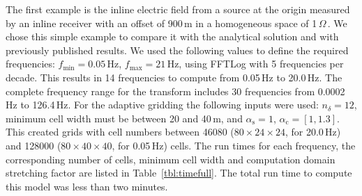 \documentclass[extra, camera,%
    referee,     %
]{gji}
\newcommand{\mr}[1]{\mathrm{#1}}
\newcommand{\ohmm}{\ensuremath{\Omega\,}\text{m}\xspace}
\begin{document}
The first example is the inline electric field from a source at the origin
measured by an inline receiver with an offset of 900\,m in a homogeneous space
of 1\,\ohmm. We chose this simple example to compare it with the analytical
solution and with previously published results. We used the following values to
define the required frequencies: $f_\mr{min}=0.05\,$Hz, $f_\mr{max}=21\,$Hz,
using FFTLog with 5 frequencies per decade. This results in 14 frequencies to
compute from 0.05\,Hz to 20.0\,Hz. The complete frequency range for the
transform includes 30 frequencies from 0.0002\,Hz to 126.4\,Hz. For the
adaptive gridding the following inputs were used: $n_\delta=12$, minimum cell
width must be between 20 and 40\,m, and $\alpha_\mr{s}=1$,
$\alpha_\mr{c}=[1,1.3]$. This created grids with cell numbers between
\num{46080} ($80\times24\times24$, for 20.0\,Hz) and \num{128000}
($80\times40\times40$, for 0.05\,Hz) cells. The run times for each frequency,
the corresponding number of cells, minimum cell width and computation domain
stretching factor are listed in Table~\ref{tbl:timefull}. The total run time to
compute this model was less than two minutes.
%
\end{document}
